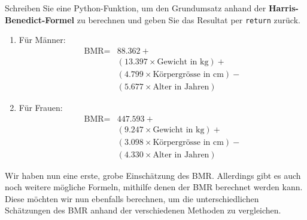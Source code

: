 \begin{myexercise}\label{ex:bmr-simple}
	Schreiben Sie eine Python-Funktion, um den Grundumsatz anhand der \textbf{Harris-Benedict-Formel} zu berechnen und geben Sie das Resultat per \lstinline|return| zurück.
	\begin{enumerate}
		\item Für Männer:
		      \begin{align*}
			      \text{BMR} = & 88.362 +                                   \\
			                   & (13.397 \times \text{Gewicht in kg}) +     \\
			                   & (4.799 \times \text{Körpergrösse in cm}) - \\
			                   & (5.677 \times \text{Alter in Jahren})
		      \end{align*}
		\item Für Frauen:
		      \begin{align*}
			      \text{BMR} = & 447.593  +                                 \\
			                   & (9.247 \times \text{Gewicht in kg}) +      \\
			                   & (3.098 \times \text{Körpergrösse in cm}) - \\
			                   & (4.330 \times \text{Alter in Jahren})
		      \end{align*}
	\end{enumerate}
	\begin{myanswer} %
		
	\end{myanswer}
\end{myexercise}

Wir haben nun eine erste, grobe Einschätzung des \gls{BMR}. Allerdings gibt es auch noch weitere mögliche Formeln, mithilfe denen der \gls{BMR} berechnet werden kann. Diese möchten wir nun ebenfalls berechnen, um die unterschiedlichen Schätzungen des \gls{BMR} anhand der verschiedenen Methoden zu vergleichen.

